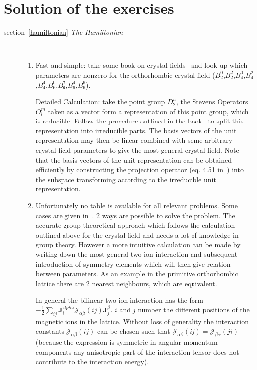 \documentclass[twoside]{article}
\newcommand{\mbf}[1]{\mathbf #1}
\begin{document}
\clearpage





\clearpage
\section{Solution of the exercises}

\begin{description}
\item[section~\ref{hamiltonian} {\em The Hamiltonian}] \ 
 \begin{enumerate}
 \item Fast and simple: take some book on crystal fields~\cite{hutchings64-227} and look up which parameters are nonzero 
 for the orthorhombic crystal field ($B_2^0$,$B_2^2$,$B_4^0$,$B_4^2$,$B_4^4$,$B_6^0$,$B_6^2$,$B_6^4$,$B_6^6$).

 Detailed Calculation: take the point group $D_2^h$, the Stevens Operators $O_l^m$ taken as a vector form
 a representation of this point group, which is reducible. Follow the procedure outlined in the book~\cite{elliott79-1}
 to split this representation into irreducible parts. The basis vectors of the unit representation may then be 
 linear combined with some arbitrary crystal field parameters to give the most general crystal field.
 Note that the basis vectors of the unit representation can be obtained efficiently by constructing the
 projection operator (eq. 4.51 in~\cite{elliott79-1})
  into the subspace transforming according to the irreducible unit representation. 
 \item Unfortunately no table is available for all relevant problems. Some cases are given in~\cite{morin90-1}.
 2 ways are possible to solve the problem. The accurate group theoretical approach which follows the calculation
 outlined above for the crystal field  and needs a lot of knowledge in group theory. However a more intuitive %
calculation
 can be made by writing down the most general two ion interaction and subsequent introduction of symmetry elements which
 will then give relation between parameters. As an example in the primitive orthorhombic lattice there are 2 nearest %
neighbours, which
 are equivalent. 

 In general the bilinear two ion interaction  has the form 
 $-\frac{1}{2}  \sum_{ij}  {\mbf J}_i^{alpha}{\mathcal J}_{\alpha\beta}(ij){\mbf J}_j^{\beta}$.
 $i$ and $j$ number the different positions of the magnetic ions in the lattice. Without loss of 
 generality the interaction constants ${\mathcal J}_{\alpha\beta}(ij)$ can be chosen such that
 ${\mathcal J}_{\alpha\beta}(ij)={\mathcal J}_{\beta\alpha}(ji)$ (because the expression is symmetric in
 angular momentum components any anisotropic part of the interaction tensor does not contribute to the
 interaction energy).  


\end{enumerate}
\end{description}
\end{document}
